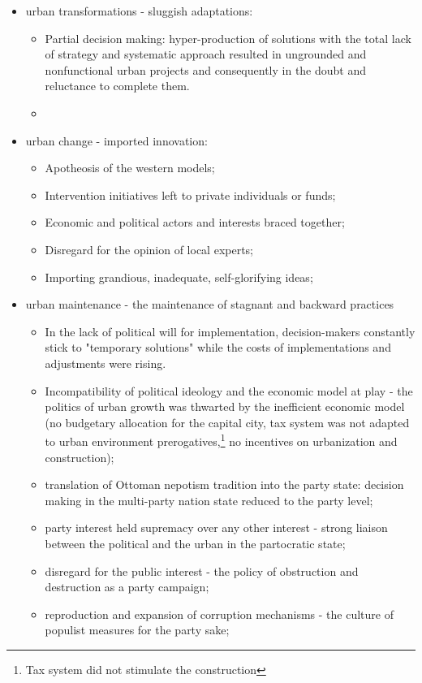 \documentclass[11pt]{report}
\begin{document}
\begin{itemize}
\item urban transformations - sluggish adaptations:
\\
\begin{itemize}
\item Partial decision making: hyper-production of solutions with the total lack of strategy and systematic approach resulted in ungrounded and nonfunctional urban projects and consequently in the doubt and reluctance to complete them.
\item 
\end{itemize}

\item urban change - imported innovation:
\begin{itemize}
\item Apotheosis of the western models;
\item Intervention initiatives left to private individuals or funds; 
\item Economic and political actors and interests braced together;
\item Disregard for the opinion of local experts;
\item Importing grandious, inadequate, self-glorifying ideas; %
\end{itemize}

\item urban maintenance - the maintenance of stagnant and backward practices
\\
\begin{itemize}
\item In the lack of political will for implementation, decision-makers constantly stick to "temporary solutions" while the costs of implementations and adjustments were rising.
\item Incompatibility of political ideology and the economic model at play - the politics of urban growth was thwarted by the inefficient economic model (no budgetary allocation for the capital city,
tax system was not adapted to urban environment prerogatives,\footnote{Tax system did not stimulate the construction}
no incentives on urbanization and construction);
\item translation of Ottoman nepotism tradition into the party state: decision making in the multi-party nation state reduced to the party level;
\item party interest held supremacy over any other interest - strong liaison between the political and the urban in the partocratic state;
\item disregard for the public interest - the policy of obstruction and destruction as a party campaign;
\item reproduction and expansion of corruption mechanisms - the culture of populist measures for the party sake; 
\end{itemize}
\end{itemize}
\end{document}
